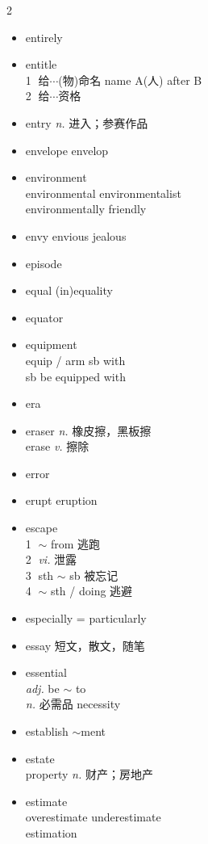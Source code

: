 \documentclass[../../book.tex]{subfiles}
\begin{document}
\begin{multicols}{2}
\begin{itemize}
\\enthusiast 热情的人
\item[-] entirely
\item[-] entitle
\\\textcircled{1} {\small 给$\cdots$(物)命名 name A(人) after B}
\\\textcircled{2} 给$\cdots$资格
\item[-] entry \emph{n.} 进入；参赛作品
\item[-] envelope \phantom{a} envelop
\item[-] environment
\\environmental environmentalist
\\environmentally friendly
\item[-] envy \phantom{a} envious jealous
\item[-] episode
\item[-] equal \phantom{a} (in)equality
\item[-] equator
\item[-] equipment
\\equip / arm sb with
\\sb be equipped with
\item[-] era
\item[-] eraser \emph{n.} 橡皮擦，黑板擦
\\erase \emph{v.} 擦除
\item[-] error
\item[-] erupt \phantom{a} eruption
\item[-] escape
\\\textcircled{1} $\sim$ from 逃跑
\\\textcircled{2} \emph{vi.} 泄露
\\\textcircled{3} sth $\sim$ sb 被忘记
\\\textcircled{4} $\sim$ sth / doing 逃避
\item[-] especially = particularly
\item[-] essay 短文，散文，随笔
\item[-] essential
\\\emph{adj.} be $\sim$ to
\\\emph{n.} 必需品 necessity
\item[-] establish \phantom{a} $\sim$ment
\item[-] estate
\\property \emph{n.} 财产；房地产
\item[-] estimate
\\overestimate underestimate
\\estimation

\end{itemize}
\end{multicols}
\end{document}
